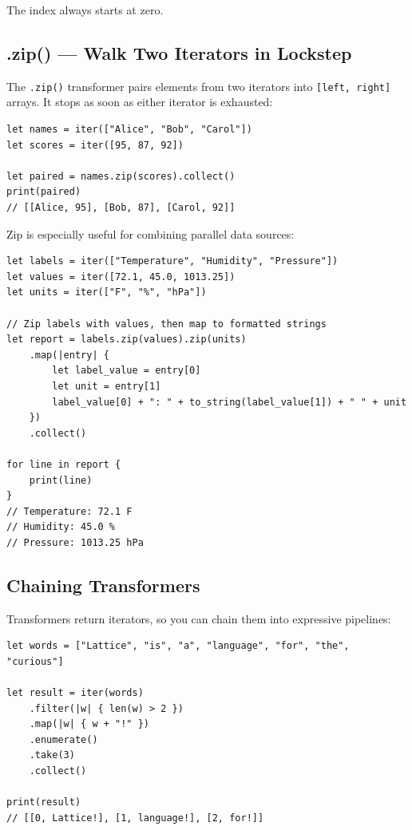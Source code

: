 The index always starts at zero.

\subsection{.zip() --- Walk Two Iterators in Lockstep}\label{subsec:iter-zip}

The \lstinline|.zip()| transformer pairs elements from two iterators into \lstinline|[left, right]| arrays.
It stops as soon as either iterator is exhausted:

\begin{lstlisting}[language=Lattice, caption={Zipping two iterators}]
let names = iter(["Alice", "Bob", "Carol"])
let scores = iter([95, 87, 92])

let paired = names.zip(scores).collect()
print(paired)
// [[Alice, 95], [Bob, 87], [Carol, 92]]
\end{lstlisting}

Zip is especially useful for combining parallel data sources:

\begin{lstlisting}[language=Lattice, caption={Merging labels with values}]
let labels = iter(["Temperature", "Humidity", "Pressure"])
let values = iter([72.1, 45.0, 1013.25])
let units = iter(["F", "%", "hPa"])

// Zip labels with values, then map to formatted strings
let report = labels.zip(values).zip(units)
    .map(|entry| {
        let label_value = entry[0]
        let unit = entry[1]
        label_value[0] + ": " + to_string(label_value[1]) + " " + unit
    })
    .collect()

for line in report {
    print(line)
}
// Temperature: 72.1 F
// Humidity: 45.0 %
// Pressure: 1013.25 hPa
\end{lstlisting}

\subsection{Chaining Transformers}\label{subsec:chaining-transformers}

Transformers return iterators, so you can chain them into expressive pipelines:

\begin{lstlisting}[language=Lattice, caption={A multi-step pipeline}]
let words = ["Lattice", "is", "a", "language", "for", "the", "curious"]

let result = iter(words)
    .filter(|w| { len(w) > 2 })
    .map(|w| { w + "!" })
    .enumerate()
    .take(3)
    .collect()

print(result)
// [[0, Lattice!], [1, language!], [2, for!]]
\end{lstlisting}

